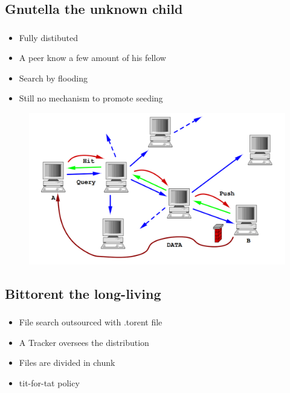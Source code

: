   \subsection{Gnutella the unknown child}
    \begin{frame}
      \frametitle{\secname}
      \framesubtitle{\subsecname}
      \begin{itemize}
        \item Fully distibuted
        \item A peer know a few amount of his fellow
        \item Search by flooding
        \item Still no mechanism to promote seeding
      \end{itemize}
      \begin{figure}
        \centering
        \includegraphics[scale=0.30]{img/P2-gnutellaProtocol.png}
      \end{figure}
    \end{frame}
    
    
  \subsection{Bittorent the long-living}
    \begin{frame}
      \frametitle{\secname}
      \framesubtitle{\subsecname}
      \begin{itemize}
        \item File search outsourced with .torent file
        \item A Tracker oversees the distribution
        \item Files are divided in chunk
        \item tit-for-tat policy
      \end{itemize}
    \end{frame}
   

